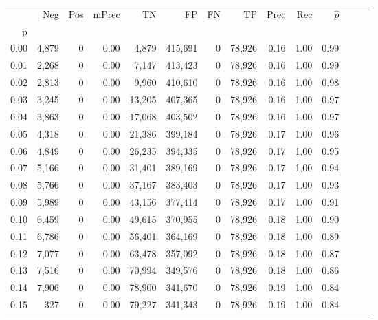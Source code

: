 \begin{tabular}{rrrrrrrrrrrrrr}
\toprule
{} &    Neg &    Pos & mPrec &       TN &       FP &      FN &      TP &  Prec &   Rec & $\hat{p}$ \\
p    &        &        &       &          &          &         &         &       &       &           \\
\midrule
0.00 &  4,879 &      0 &  0.00 &    4,879 &  415,691 &       0 &  78,926 &  0.16 &  1.00 &      0.99 \\
0.01 &  2,268 &      0 &  0.00 &    7,147 &  413,423 &       0 &  78,926 &  0.16 &  1.00 &      0.99 \\
0.02 &  2,813 &      0 &  0.00 &    9,960 &  410,610 &       0 &  78,926 &  0.16 &  1.00 &      0.98 \\
0.03 &  3,245 &      0 &  0.00 &   13,205 &  407,365 &       0 &  78,926 &  0.16 &  1.00 &      0.97 \\
0.04 &  3,863 &      0 &  0.00 &   17,068 &  403,502 &       0 &  78,926 &  0.16 &  1.00 &      0.97 \\
0.05 &  4,318 &      0 &  0.00 &   21,386 &  399,184 &       0 &  78,926 &  0.17 &  1.00 &      0.96 \\
0.06 &  4,849 &      0 &  0.00 &   26,235 &  394,335 &       0 &  78,926 &  0.17 &  1.00 &      0.95 \\
0.07 &  5,166 &      0 &  0.00 &   31,401 &  389,169 &       0 &  78,926 &  0.17 &  1.00 &      0.94 \\
0.08 &  5,766 &      0 &  0.00 &   37,167 &  383,403 &       0 &  78,926 &  0.17 &  1.00 &      0.93 \\
0.09 &  5,989 &      0 &  0.00 &   43,156 &  377,414 &       0 &  78,926 &  0.17 &  1.00 &      0.91 \\
0.10 &  6,459 &      0 &  0.00 &   49,615 &  370,955 &       0 &  78,926 &  0.18 &  1.00 &      0.90 \\
0.11 &  6,786 &      0 &  0.00 &   56,401 &  364,169 &       0 &  78,926 &  0.18 &  1.00 &      0.89 \\
0.12 &  7,077 &      0 &  0.00 &   63,478 &  357,092 &       0 &  78,926 &  0.18 &  1.00 &      0.87 \\
0.13 &  7,516 &      0 &  0.00 &   70,994 &  349,576 &       0 &  78,926 &  0.18 &  1.00 &      0.86 \\
0.14 &  7,906 &      0 &  0.00 &   78,900 &  341,670 &       0 &  78,926 &  0.19 &  1.00 &      0.84 \\
0.15 &    327 &      0 &  0.00 &   79,227 &  341,343 &       0 &  78,926 &  0.19 &  1.00 &      0.84 \\

\end{tabular}
